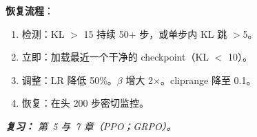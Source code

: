 \begin{questionbox}
\textbf{恢复流程}：

\begin{enumerate}
  \item 检测：KL $>$ 15 持续 50+ 步，或单步内 KL 跳 $>$5。
  \item 立即：加载最近一个干净的 checkpoint（KL $<$ 10）。
  \item 调整：LR 降低 50\%。$\beta$ 增大 2$\times$。cliprange 降至 0.1。
  \item 恢复：在头 200 步密切监控。
\end{enumerate}

\emph{\textbf{复习：} 第~5 与~7 章（PPO；GRPO）。}
\end{questionbox}

